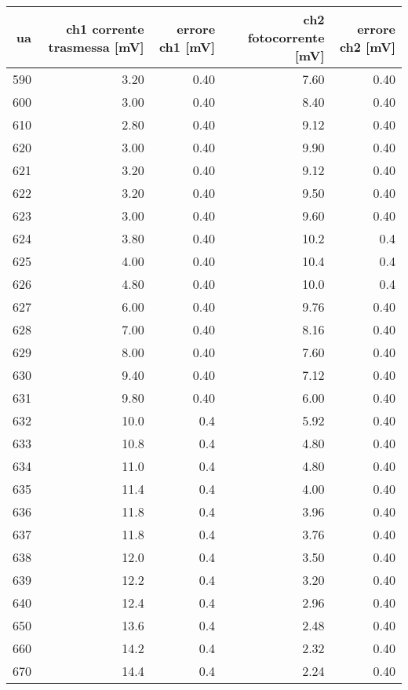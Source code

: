 \begin{tabular}{rrrrr}
\toprule
ua & ch1 corrente trasmessa [mV] & errore ch1 [mV] & ch2 fotocorrente [mV] & errore ch2 [mV] \\
\midrule
590 & 3.20 & 0.40 & 7.60 & 0.40 \\
600 & 3.00 & 0.40 & 8.40 & 0.40 \\
610 & 2.80 & 0.40 & 9.12 & 0.40 \\
620 & 3.00 & 0.40 & 9.90 & 0.40 \\
621 & 3.20 & 0.40 & 9.12 & 0.40 \\
622 & 3.20 & 0.40 & 9.50 & 0.40 \\
623 & 3.00 & 0.40 & 9.60 & 0.40 \\
624 & 3.80 & 0.40 & 10.2 & 0.4 \\
625 & 4.00 & 0.40 & 10.4 & 0.4 \\
626 & 4.80 & 0.40 & 10.0 & 0.4 \\
627 & 6.00 & 0.40 & 9.76 & 0.40 \\
628 & 7.00 & 0.40 & 8.16 & 0.40 \\
629 & 8.00 & 0.40 & 7.60 & 0.40 \\
630 & 9.40 & 0.40 & 7.12 & 0.40 \\
631 & 9.80 & 0.40 & 6.00 & 0.40 \\
632 & 10.0 & 0.4 & 5.92 & 0.40 \\
633 & 10.8 & 0.4 & 4.80 & 0.40 \\
634 & 11.0 & 0.4 & 4.80 & 0.40 \\
635 & 11.4 & 0.4 & 4.00 & 0.40 \\
636 & 11.8 & 0.4 & 3.96 & 0.40 \\
637 & 11.8 & 0.4 & 3.76 & 0.40 \\
638 & 12.0 & 0.4 & 3.50 & 0.40 \\
639 & 12.2 & 0.4 & 3.20 & 0.40 \\
640 & 12.4 & 0.4 & 2.96 & 0.40 \\
650 & 13.6 & 0.4 & 2.48 & 0.40 \\
660 & 14.2 & 0.4 & 2.32 & 0.40 \\
670 & 14.4 & 0.4 & 2.24 & 0.40 \\
\bottomrule
\end{tabular}
